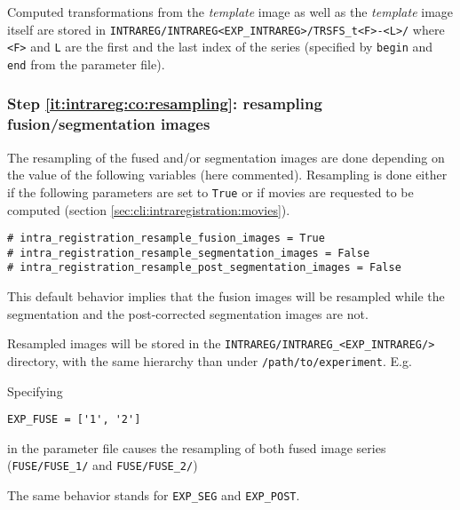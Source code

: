 Computed transformations from the \textit{template} image as well as the \textit{template} image itself are stored in \verb|INTRAREG/INTRAREG<EXP_INTRAREG>/TRSFS_t<F>-<L>/| where \verb|<F>| and \verb|L| are the first and the last index of the series (specified by \verb|begin| and \verb|end| from the parameter file).


\subsubsection{Step \ref{it:intrareg:co:resampling}: resampling fusion/segmentation images}
\label{sec:cli:intraregistration:resampling}

The resampling of the fused and/or segmentation images are done
depending on the value of the following variables (here commented). Resampling is done
either if the following parameters are set to \verb|True| or if movies
are requested to be computed (section \ref{sec:cli:intraregistration:movies}).
\begin{verbatim}
# intra_registration_resample_fusion_images = True
# intra_registration_resample_segmentation_images = False
# intra_registration_resample_post_segmentation_images = False
\end{verbatim}
This default behavior implies that the fusion images will be resampled
while the segmentation and the post-corrected segmentation images are not.


Resampled images will be stored in the
\texttt{INTRAREG/INTRAREG\_<EXP\_INTRAREG/>} directory, with the same
hierarchy than under \texttt{/path/to/experiment}. E.g. 

\mbox{}
\mbox{}

Specifying
\begin{verbatim}
EXP_FUSE = ['1', '2']
\end{verbatim}
in the parameter file causes the resampling of both fused image series
(\texttt{FUSE/FUSE\_1/} and \texttt{FUSE/FUSE\_2/})

\mbox{}
\mbox{}

The same behavior stands for \texttt{EXP\_SEG} and  \texttt{EXP\_POST}.


